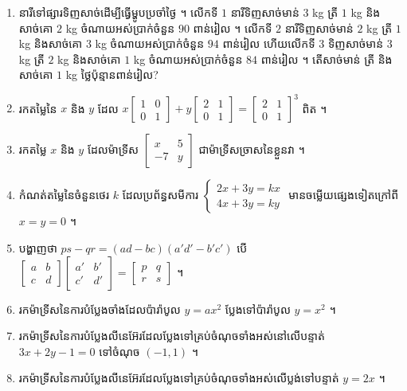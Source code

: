 \begin{enumerate}[1]
\begin{enumerate}[a]
  \end{enumerate}
  \item នារីទៅផ្សារទិញសាច់ដើម្បីធ្វើម្ហូបប្រចាំថ្ងៃ ។ លើកទី $1$ នារីទិញសាច់មាន់ $3$ kg ត្រី $1$ kg និងសាច់គោ $2$ kg ចំណាយអស់ប្រាក់ចំនួន $90$ ពាន់រៀល ។ លើកទី $2$ នារីទិញសាច់មាន់ $2$ kg ត្រី $1$ kg និងសាច់គោ $3$ kg ចំណាយអស់ប្រាក់ចំនួន $94$ ពាន់រៀល ហើយលើកទី $3$ ទិញសាច់មាន់ $3$ kg ត្រី $2$ kg និងសាច់គោ $1$ kg ចំណាយអស់ប្រាក់ចំនួន $84$ ពាន់រៀល ។ តើសាច់មាន់ ត្រី និងសាច់គោ $1$ kg ថ្លៃប៉ុន្មានពាន់រៀល?
  \item រកតម្លៃនៃ $x$ និង $y$ ដែល $x\begin{bmatrix} 1 & 0\\ 0 & 1 \end{bmatrix} + y\begin{bmatrix} 2 & 1\\ 0 & 1 \end{bmatrix} = \begin{bmatrix} 2 & 1\\ 0 & 1 \end{bmatrix}^3$ ពិត ។
  \item រកតម្លៃ $x$ និង $y$ ដែលម៉ាទ្រីស $\begin{bmatrix} x & 5\\ -7 & y \end{bmatrix}$ ជាម៉ាទ្រីសច្រាសនៃខ្លួនវា ។
  \item កំណត់តម្លៃនៃចំនួនថេរ $k$ ដែលប្រព័ន្ធសមីការ $\begin{cases} 2x + 3y = kx\\ 4x + 3y = ky \end{cases}$ មានចម្លើយផ្សេងទៀតក្រៅពី $x = y = 0$ ។
  \item បង្ហាញថា $ps - qr = (ad - bc)(a'd' - b'c')$ បើ $\begin{bmatrix} a & b\\ c & d \end{bmatrix}\begin{bmatrix} a' & b'\\ c' & d' \end{bmatrix} = \begin{bmatrix} p & q\\ r & s \end{bmatrix}$ ។
  \item រកម៉ាទ្រីសនៃការបំប្លែងចាំងដែលប៉ារ៉ាបូល $y = ax^2$ ប្លែងទៅប៉ារ៉ាបូល $y = x^2$ ។
  \item រកម៉ាទ្រីសនៃការបំប្លែងលីនេអ៊ែរដែលប្លែងទៅគ្រប់ចំណុចទាំងអស់នៅលើបន្ទាត់ $3x + 2y - 1 = 0$ ទៅចំណុច $(-1, 1)$ ។
  \item រកម៉ាទ្រីសនៃការបំប្លែងលីនេអ៊ែរដែលប្លែងទៅគ្រប់ចំណុចទាំងអស់លើប្លង់ទៅបន្ទាត់ $y = 2x$ ។

\end{enumerate}
